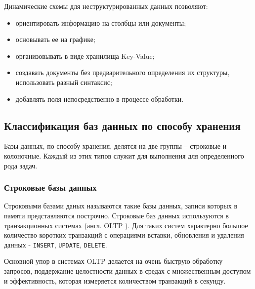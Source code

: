 Динамические схемы для неструктурированных данных позволяют:

\begin{itemize}
    \item ориентировать информацию на столбцы или документы;
    \item основывать ее на графике;
    \item организовывать в виде хранилища Key-Value;
    \item создавать документы без предварительного определения их структуры, использовать разный синтаксис;
    \item добавлять поля непосредственно в процессе обработки.
\end{itemize}

%
%

\subsection{Классификация баз данных по способу хранения}

Базы данных, по способу хранения, делятся на две группы -- строковые и колоночные. Каждый из этих типов служит для выполнения для определенного рода задач.

\subsubsection{Строковые базы данных}

Строковыми базами даных называются такие базы данных, записи которых в памяти представляются построчно.
Строковые баз данных используются в транзакционных системах (англ. OLTP \cite{OLTP}). Для таких систем характерно большое количество коротких транзакций с операциями вставки, обновления и удаления данных - \texttt{INSERT}, \texttt{UPDATE}, \texttt{DELETE}.

Основной упор в системах OLTP делается на очень быструю обработку запросов, поддержание целостности данных в средах с множественным доступом и эффективность, которая измеряется количеством транзакций в секунду.

